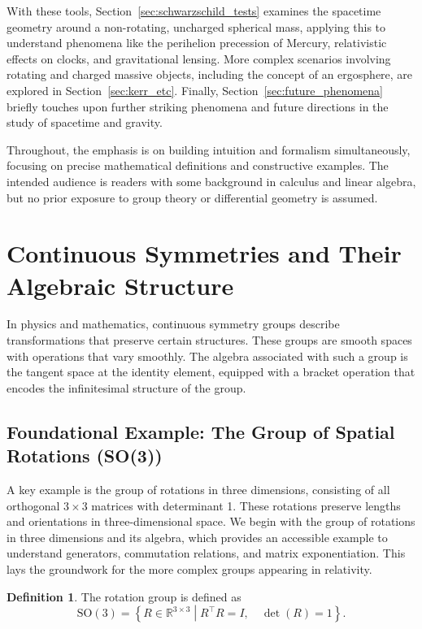 \documentclass{amsart}
\theoremstyle{definition}
\newtheorem{definition}{Definition}[theorem]
\theoremstyle{remark}
\begin{document}
With these tools, Section~\ref{sec:schwarzschild_tests} examines the spacetime geometry around a non-rotating, uncharged spherical mass, applying this to understand phenomena like the perihelion precession of Mercury, relativistic effects on clocks, and gravitational lensing. More complex scenarios involving rotating and charged massive objects, including the concept of an ergosphere, are explored in Section~\ref{sec:kerr_etc}. Finally, Section~\ref{sec:future_phenomena} briefly touches upon further striking phenomena and future directions in the study of spacetime and gravity.

Throughout, the emphasis is on building intuition and formalism simultaneously, focusing on precise mathematical definitions and constructive examples. The intended audience is readers with some background in calculus and linear algebra, but no prior exposure to group theory or differential geometry is assumed.

\section{Continuous Symmetries and Their Algebraic Structure}
\label{sec:cont_symm}

In physics and mathematics, continuous symmetry groups describe transformations that preserve certain structures. These groups are smooth spaces with operations that vary smoothly. The algebra associated with such a group is the tangent space at the identity element, equipped with a bracket operation that encodes the infinitesimal structure of the group.

\subsection{Foundational Example: The Group of Spatial Rotations (SO(3))}
\label{subsec:so3}
A key example is the group of rotations in three dimensions, consisting of all orthogonal \(3 \times 3\) matrices with determinant 1. These rotations preserve lengths and orientations in three-dimensional space. We begin with the group of rotations in three dimensions and its algebra, which provides an accessible example to understand generators, commutation relations, and matrix exponentiation. This lays the groundwork for the more complex groups appearing in relativity.

\begin{definition}
  The rotation group is defined as
  \[
  \mathrm{SO}(3) = \left\{ R \in \mathbb{R}^{3 \times 3} \middle|
  R^\top R = I, \quad \det(R) = 1 \right\}.
  \]
\end{definition}
\end{document}

